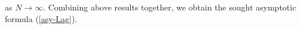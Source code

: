 \documentclass[11pt,a4paper]{article}
\numberwithin{equation}{section} %
\theoremstyle{plain}
\newtheorem{prop}{Proposition}
\theoremstyle{definition}
\numberwithin{prop}{section}
\numberwithin{cor}{section}
\numberwithin{remark}{section}
\begin{document}
as $N\to\infty$. Combining above results together, we obtain the sought asymptotic formula
(\ref{asy-Lag}).
\end{document}
